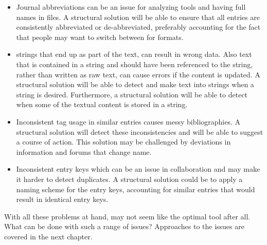 \begin{itemize}
\item Journal abbreviations can be an issue for analyzing tools and
  having full names in {\bibtex} files.  A structural solution will be
  able to ensure that all entries are consistently abbreviated or
  de-abbreviated, preferably accounting for the fact that people may
  want to switch between for formats.

\item {\bibtex} strings that end up as part of the text, can result in
  wrong data.  Also text that is contained in a string and should have
  been referenced to the string, rather than written as raw text, can
  cause errors if the content is updated.  A structural solution will
  be able to detect and make text into strings when a string is
  desired.  Furthermore, a structural solution will be able to detect
  when some of the textual content is stored in a string.

\item Inconsistent tag usage in similar entries causes messy
  bibliographies. A structural solution will detect these
  inconsistencies and will be able to suggest a course of action.
  This solution may be challenged by deviations in information and
  forums that change name.

\item Inconsistent entry keys which can be an issue in collaboration
  and may make it harder to detect duplicates.  A structural solution
  could be to apply a naming scheme for the entry keys, accounting for
  similar entries that would result in identical entry keys.
\end{itemize}

With all these problems at hand, {\bibtex} may not seem like the
optimal tool after all.  What can be done with such a range of
issues?  Approaches to the issues are covered in the next chapter.